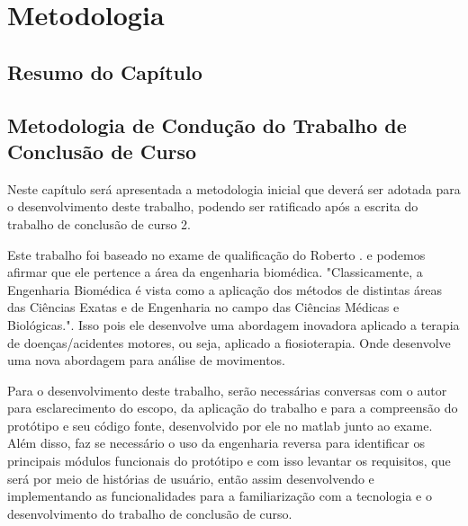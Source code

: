 
\chapter[Metodologia]{Metodologia}

\section{Resumo do Capítulo}

\section{Metodologia de Condução do Trabalho de Conclusão de Curso}
\label{Sec:MetCondTCC}

  Neste capítulo será apresentada a metodologia inicial que deverá ser adotada
para o desenvolvimento deste trabalho, podendo ser ratificado após a escrita do
trabalho de conclusão de curso 2.

  Este trabalho foi baseado no exame de qualificação do Roberto \cite{roberto}.
e podemos afirmar que ele pertence a área da engenharia biomédica. "Classicamente, 
a Engenharia Biomédica é vista como a aplicação dos métodos de distintas áreas 
das Ciências Exatas e de Engenharia no campo das Ciências Médicas e 
Biológicas."\cite{engenhariaBiomedica}. Isso pois ele desenvolve uma abordagem 
inovadora aplicado a terapia de  doenças/acidentes motores, ou seja, aplicado a
 fiosioterapia. Onde desenvolve uma nova abordagem para análise de movimentos.

  Para o desenvolvimento deste trabalho, serão necessárias conversas com 
o autor para esclarecimento do escopo, da aplicação do trabalho e para a compreensão
do protótipo e seu código fonte, desenvolvido por ele no matlab junto ao exame. 
Além disso, faz se necessário o uso da engenharia reversa para identificar os 
principais módulos funcionais do protótipo e com isso levantar os requisitos, 
que será por meio de histórias de usuário, então assim desenvolvendo e 
implementando as funcionalidades para a familiarização com a tecnologia e o 
desenvolvimento do trabalho de conclusão de curso.
  
